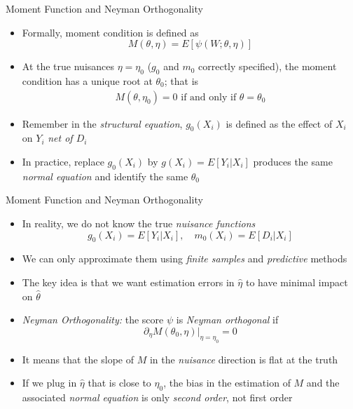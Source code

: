 \documentclass[aspectratio=1610,12pt,xcolor=dvipsnames]{beamer}
\begin{document}
\begin{frame}{Moment Function and Neyman Orthogonality}
\begin{itemize}
    \item Formally, moment condition is defined as
    \[M(\theta, \eta) = E[\psi(W; \theta, \eta)]\]
    \item At the true nuisances $\eta = \eta_0$ ($g_0$ and $m_0$ correctly specified), the moment condition has a unique root at $\theta_0$; that is
    \begin{align*}
        M(\theta, \eta_0) = 0 \text{ if and only if } \theta=\theta_0
    \end{align*}
    \item Remember in the \textit{structural equation}, $g_0(X_i)$ is defined as the effect of $X_i$ on $Y_i$ \emph{net of $D_i$}
    \item In practice, replace $g_0(X_i)$ by $g(X_i) = E[Y_i|X_i]$ produces the same \textit{normal equation} and identify the same $\theta_0$
\end{itemize}
\end{frame}

\begin{frame}{Moment Function and Neyman Orthogonality}

\begin{itemize}
    \item In reality, we do not know the true \textit{nuisance functions}
    \[
    g_0(X_i) = E[Y_i|X_i], \quad m_0(X_i) = E[D_i|X_i]
    \]
    \item We can only approximate them using \textit{finite samples} and \textit{predictive} methods
    \item The key idea is that we want estimation errors in $\hat \eta$ to have minimal impact on $\hat\theta$
    \item \textit{Neyman Orthogonality:} the score $\psi$ is \textit{Neyman orthogonal} if
    \[
    \partial_\eta M(\theta_0,\eta)\Big|_{\eta=\eta_0} = 0
    \]
    \item It means that the slope of $M$ in the \textit{nuisance} direction is flat at the truth
    \item If we plug in $\hat \eta$ that is close to $\eta_0$, the bias in the estimation of $M$ and the associated \textit{normal equation} is only \textit{second order}, not first order
\end{itemize}
\end{frame}
\end{document}
